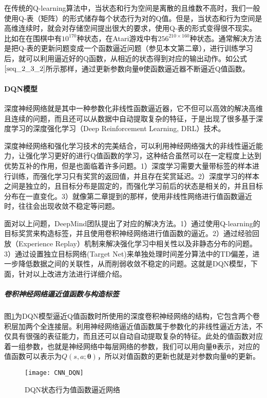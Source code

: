 在传统的Q-learning算法中，当状态和行为空间是离散的且维数不高时，我们一般使用Q-表（矩阵）的形式储存每个状态行为对的Q值。但是，当状态和行为空间是高维连续时，就会对存储空间提出很大的要求，使用Q-表的形式变得很不现实。比如在在围棋中有$10^{170}$种状态，在Atari游戏中有$256^{210\times160}$种状态。通常解决方法是把Q-表的更新问题变成一个函数逼近问题（参见本文第二章），进行训练学习后，就可以利用逼近好的Q函数，从相近的状态得到对应的输出动作。如公式$\eqref{seq_2_3_2}$所示那样，通过更新参数向量$\bm{\theta}$使函数逼近器不断逼近Q值函数。

 \paragraph{DQN模型}
深度神经网络就是其中一种参数化非线性函数逼近器，它不但可以高效的解决高维且连续的问题，而且还可以从数据中自动提取复杂的特征，于是出现了很多基于深度学习的深度强化学习（Deep Reinforcement Learning, DRL）技术。

深度神经网络和强化学习技术的完美结合，可以利用神经网络强大的非线性逼近能力，让强化学习更好的进行Q值函数的学习，这种结合虽然可以在一定程度上达到优势互补的作用，但是也面临着许多问题。1）深度学习需要大量带标签的样本进行训练，而强化学习只有奖赏的返回值，并且存在奖赏延迟。2）深度学习的样本之间是独立的，且目标分布是固定的，而强化学习前后的状态是相关的，并且目标分布在一直变化。3）就像第二章提到的那样，使用非线性网络进行值函数逼近时，往往会出现收敛不稳定等问题。

面对以上问题，DeepMind团队提出了对应的解决方法。1）通过使用Q-learning的目标奖赏来构造标签，并且使用卷积神经网络进行值函数的逼近。2）通过经验回放（Experience Replay）机制来解决强化学习中相关性以及非静态分布的问题。3）通过设置独立目标网络(Target Net)来单独处理时间差分算法中的TD偏差，进一步降低数据之间的关联性，从而削弱收敛不稳定的问题。这就是DQN模型，下面，针对以上改进方法进行详细介绍。

 \subparagraph{卷积神经网络逼近值函数与构造标签}
图\ref{fig:CNN_DQN}为DQN模型逼近Q值函数时所使用的深度卷积神经网络的结构，它包含两个卷积层加两个全连接层。利用神经网络逼近值函数属于参数化的非线性逼近方法，不仅具有很强的表征能力，而且还可以自动自动提取复杂的特征。此处的值函数对应着一组参数，也就是神经网络中每层网络的参数，我们可以用向量$\bm{\theta}$表示，对应的值函数可以表示为$Q(s,a;\bm{\theta})$，所以对值函数的更新也就是对参数向量$\bm{\theta}$的更新。
\begin{figure}[htbp]
\centering
\texttt{[image: CNN\_DQN]}
\caption{DQN状态行为值函数逼近网络}
\label{fig:CNN_DQN}
\end{figure}

